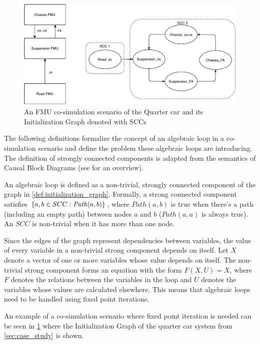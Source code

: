 \begin{figure}
    \centering
    \includegraphics[width=1\textwidth]{images/quarter_car_SCC.pdf}
    \caption{An FMU co-simulation scenario of the Quarter car and its Initialization Graph denoted with SCCs}
    \label{fig:fmu_cycle}
\end{figure}

The following definitions formalize the concept of an algebraic loop in a co-simulation scenario and define the problem these algebraic loops are introducing.
The definition of strongly connected components is adapted from the semantics of Causal Block Diagrams (see \cite{Gomes2020} for an overview).

\begin{definition} \label{def:loop}
An algebraic loop is defined as a non-trivial, strongly connected component of the graph in \cref{def:initialization_graph}.
Formally, a strong connected component satisfies $ \left\{ a,b \in SCC: \mathit{Path}(a,b) \right\}$, where $\mathit{Path}(a,b)$ is true when there's a path (including an empty path) between nodes $a$ and $b$ ($\mathit{Path}(a,a)$ is always true).
An $SCC$ is non-trivial when it has more than one node.
\end{definition}

Since the edges of the graph represent dependencies between variables, the value of every variable in a non-trivial strong component depends on itself.
Let $X$ denote a vector of one or more variables whose value depends on itself. The non-trivial strong component forms an equation with the form $F(X, U) = X$, where $F$ denotes the relations between the variables in the loop and $U$ denotes the variables whose values are calculated elsewhere. 
This means that algebraic loops need to be handled using fixed point iterations\cite{Gomes2018}. 

An example of a co-simulation scenario where fixed point iteration is needed can be seen in \cref{fig:fmu_cycle} where the Initialization Graph of the quarter car system from \cref{sec:case_study} is shown.

